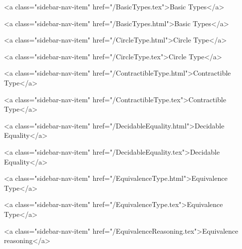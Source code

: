       
    
      
        
          <a class="sidebar-nav-item" href="/BasicTypes.tex">Basic Types</a>
        
      
    
      
        
          <a class="sidebar-nav-item" href="/BasicTypes.html">Basic Types</a>
        
      
    
      
        
          <a class="sidebar-nav-item" href="/CircleType.html">Circle Type</a>
        
      
    
      
        
          <a class="sidebar-nav-item" href="/CircleType.tex">Circle Type</a>
        
      
    
      
        
          <a class="sidebar-nav-item" href="/ContractibleType.html">Contractible Type</a>
        
      
    
      
        
          <a class="sidebar-nav-item" href="/ContractibleType.tex">Contractible Type</a>
        
      
    
      
        
          <a class="sidebar-nav-item" href="/DecidableEquality.html">Decidable Equality</a>
        
      
    
      
        
          <a class="sidebar-nav-item" href="/DecidableEquality.tex">Decidable Equality</a>
        
      
    
      
        
          <a class="sidebar-nav-item" href="/EquivalenceType.html">Equivalence Type</a>
        
      
    
      
        
          <a class="sidebar-nav-item" href="/EquivalenceType.tex">Equivalence Type</a>
        
      
    
      
        
          <a class="sidebar-nav-item" href="/EquivalenceReasoning.tex">Equivalence reasoning</a>
        
